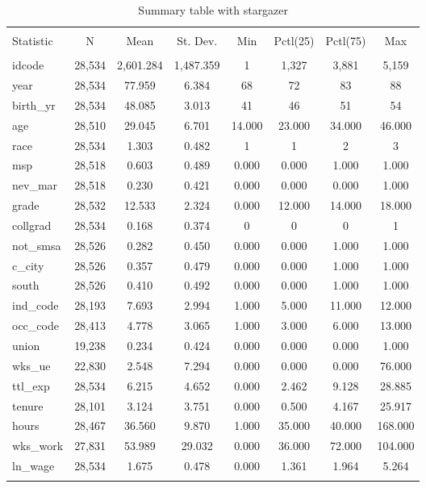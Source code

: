 \documentclass[
]{article}
\begin{document}
\begin{table}[ht] \centering 
  \caption{Summary table with stargazer} 
  \label{table1} 
\begin{tabular}{@{\extracolsep{5pt}}lccccccc} 
\\[-1.8ex]\hline 
\hline \\[-1.8ex] 
Statistic & \multicolumn{1}{c}{N} & \multicolumn{1}{c}{Mean} & \multicolumn{1}{c}{St. Dev.} & \multicolumn{1}{c}{Min} & \multicolumn{1}{c}{Pctl(25)} & \multicolumn{1}{c}{Pctl(75)} & \multicolumn{1}{c}{Max} \\ 
\hline \\[-1.8ex] 
idcode & 28,534 & 2,601.284 & 1,487.359 & 1 & 1,327 & 3,881 & 5,159 \\ 
year & 28,534 & 77.959 & 6.384 & 68 & 72 & 83 & 88 \\ 
birth\_yr & 28,534 & 48.085 & 3.013 & 41 & 46 & 51 & 54 \\ 
age & 28,510 & 29.045 & 6.701 & 14.000 & 23.000 & 34.000 & 46.000 \\ 
race & 28,534 & 1.303 & 0.482 & 1 & 1 & 2 & 3 \\ 
msp & 28,518 & 0.603 & 0.489 & 0.000 & 0.000 & 1.000 & 1.000 \\ 
nev\_mar & 28,518 & 0.230 & 0.421 & 0.000 & 0.000 & 0.000 & 1.000 \\ 
grade & 28,532 & 12.533 & 2.324 & 0.000 & 12.000 & 14.000 & 18.000 \\ 
collgrad & 28,534 & 0.168 & 0.374 & 0 & 0 & 0 & 1 \\ 
not\_smsa & 28,526 & 0.282 & 0.450 & 0.000 & 0.000 & 1.000 & 1.000 \\ 
c\_city & 28,526 & 0.357 & 0.479 & 0.000 & 0.000 & 1.000 & 1.000 \\ 
south & 28,526 & 0.410 & 0.492 & 0.000 & 0.000 & 1.000 & 1.000 \\ 
ind\_code & 28,193 & 7.693 & 2.994 & 1.000 & 5.000 & 11.000 & 12.000 \\ 
occ\_code & 28,413 & 4.778 & 3.065 & 1.000 & 3.000 & 6.000 & 13.000 \\ 
union & 19,238 & 0.234 & 0.424 & 0.000 & 0.000 & 0.000 & 1.000 \\ 
wks\_ue & 22,830 & 2.548 & 7.294 & 0.000 & 0.000 & 0.000 & 76.000 \\ 
ttl\_exp & 28,534 & 6.215 & 4.652 & 0.000 & 2.462 & 9.128 & 28.885 \\ 
tenure & 28,101 & 3.124 & 3.751 & 0.000 & 0.500 & 4.167 & 25.917 \\ 
hours & 28,467 & 36.560 & 9.870 & 1.000 & 35.000 & 40.000 & 168.000 \\ 
wks\_work & 27,831 & 53.989 & 29.032 & 0.000 & 36.000 & 72.000 & 104.000 \\ 
ln\_wage & 28,534 & 1.675 & 0.478 & 0.000 & 1.361 & 1.964 & 5.264 \\ 
\hline \\[-1.8ex] 
\end{tabular} 
\end{table}
\end{document}
